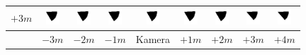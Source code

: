 \begin{tabular}{|c|c|c|c|c|c|c|c|c|}
	\hline 
	$+3m$ &
	\includegraphics[width=0.5cm]{img_Bereich/V2_vid_Winkel_Y_-3000_3000.png}&
	\includegraphics[width=0.5cm]{img_Bereich/V2_vid_Winkel_Y_-2000_3000.png}&
	\includegraphics[width=0.5cm]{img_Bereich/V2_vid_Winkel_Y_-1000_3000.png}&
	\includegraphics[width=0.5cm]{img_Bereich/V2_vid_Winkel_Y_0_3000.png}&
	\includegraphics[width=0.5cm]{img_Bereich/V2_vid_Winkel_Y_1000_3000.png}&
	\includegraphics[width=0.5cm]{img_Bereich/V2_vid_Winkel_Y_2000_3000.png}&
	\includegraphics[width=0.5cm]{img_Bereich/V2_vid_Winkel_Y_3000_3000.png}&
	\includegraphics[width=0.5cm]{img_Bereich/V2_vid_Winkel_Y_4000_3000.png}\\ 
	\hline 
	& $-3m$ & $-2m$ & $-1m$ &Kamera& $+1m$ & $+2m$ & $+3m$ & $+4m$ \\ 
	\hline 
\end{tabular}